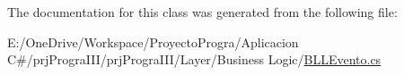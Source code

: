 The documentation for this class was generated from the following file\+:\begin{DoxyCompactItemize}
\item 
E\+:/\+One\+Drive/\+Workspace/\+Proyecto\+Progra/\+Aplicacion C\#/prj\+Progra\+I\+I\+I/prj\+Progra\+I\+I\+I/\+Layer/\+Business Logic/\hyperlink{_b_l_l_evento_8cs}{B\+L\+L\+Evento.\+cs}\end{DoxyCompactItemize}
